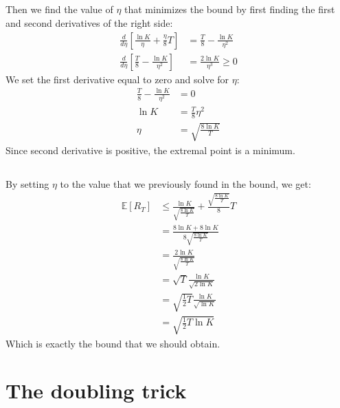 \documentclass[a4paper]{article}
\begin{document}
\subsection{}
\label{subsec:22}
Then we find the value of $\eta$ that minimizes the bound by first finding the
first and second derivatives of the right side:
\begin{align*}
  \frac{d}{d\eta} \left[\frac{\ln{K}}{\eta} + \frac{\eta}{8}T\right]&=
  \frac{T}{8} - \frac{\ln{K}}{\eta^2}\\
  \frac{d}{d\eta} \left[\frac{T}{8} - \frac{\ln{K}}{\eta^2} \right]
  &= \frac{2\ln{K}}{\eta^3} \geq 0 \tag{since $\eta > 0$ and $K>1$}
\end{align*}
We set the first derivative equal to zero and solve for $\eta$:
\begin{align*}
\frac{T}{8} - \frac{\ln{K}}{\eta^2} &= 0\\
\ln{K} &= \frac{T}{8}\eta^2\\
\eta &= \sqrt{\frac{8\ln{K}}{T}}
\end{align*}
Since second derivative is positive, the extremal point is a minimum.
\subsection{}
\label{subsec:23}
By setting $\eta$ to the value that we previously found in the bound, we get:
\begin{align*}
  \mathbb{E}\left[R_{T}\right] &\leq
  \frac{\ln K}{\sqrt{\frac{8\ln{K}}{T}}}+\frac{\sqrt{\frac{8\ln{K}}{T}}}{8} T\\
  &= \frac{8\ln{K} + 8\ln{K}} {8\sqrt{\frac{8\ln{K}}{T}}}\\
  &= \frac{2\ln{K}}{\sqrt{\frac{8\ln{K}}{T}}}\\
  &= \sqrt{T} \frac{\ln{K}}{\sqrt{2\ln{K}}}\\
  &= \sqrt{\frac{1}{2}T} \frac{\ln{K}}{\sqrt{\ln{K}}}\\
  &= \sqrt{\frac{1}{2}T \ln{K}}
\end{align*}
Which is exactly the bound that we should obtain.

\section{The doubling trick}
\label{sec:3}
\end{document}
